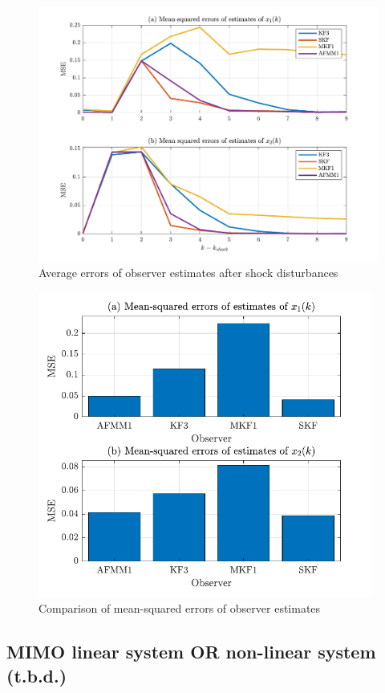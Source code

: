 \begin{figure}[htp]
	\centering
	\includegraphics[width=14cm]{images/rod_obs_sim2_7_mse_ashocks.pdf}
	\caption{Average errors of observer estimates after shock disturbances}
	\label{fig:rod_obs_sim2_7_mse_ashocks}
\end{figure}

\begin{figure}[htp]
	\centering
	\includegraphics[width=11cm]{images/rod-obs-sim-1-7-MSE-DRAFT.pdf}
	\caption{Comparison of mean-squared errors of observer estimates}
	\label{fig:rod-obs-sim-1-7-MSE}
\end{figure}

\subsection{MIMO linear system OR non-linear system (t.b.d.)}

